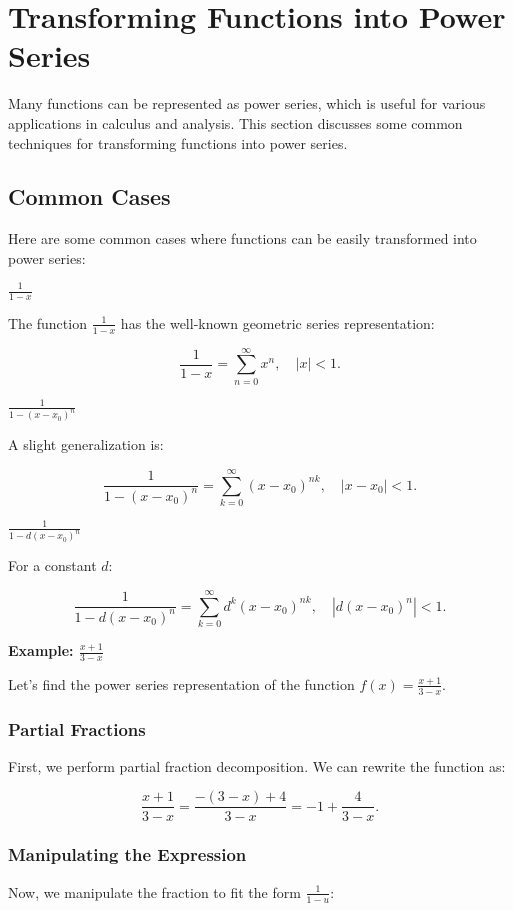 \newpage
\section{Transforming Functions into Power Series}

Many functions can be represented as power series, which is useful for various applications in calculus 
and analysis. This section discusses some common techniques for transforming functions into power series.

\subsection{Common Cases}
Here are some common cases where functions can be easily transformed into power series:

\(\frac{1}{1 - x}\)

The function \(\frac{1}{1 - x}\) has the well-known geometric series representation:

\[
    \frac{1}{1 - x} = \sum_{n=0}^{\infty} x^n, \quad |x| < 1.
\]

\(\frac{1}{1 - {(x - x_0)}^n}\)

A slight generalization is:

\[
    \frac{1}{1 - {(x - x_0)}^n} = \sum_{k=0}^{\infty} {(x - x_0)}^{nk}, \quad |x - x_0| < 1.
\]

\(\frac{1}{1 - d{(x - x_0)}^n}\)

For a constant \(d\):

\[
    \frac{1}{1 - d{(x - x_0)}^n} = \sum_{k=0}^{\infty} d^k {(x - x_0)}^{nk}, \quad |d{(x - x_0)}^n| < 1.
\]

\textbf{Example: \(\frac{x + 1}{3 - x}\)}
\vspace{\baselineskip}

Let's find the power series representation of the function \(f(x) = \frac{x + 1}{3 - x}\).

\subsubsection{Partial Fractions}

First, we perform partial fraction decomposition. We can rewrite the function as:

\[
    \frac{x + 1}{3 - x} = \frac{-(3 - x) + 4}{3 - x} = -1 + \frac{4}{3 - x}.
\]

\subsubsection{Manipulating the Expression}
Now, we manipulate the fraction to fit the form \(\frac{1}{1 - u}\):

